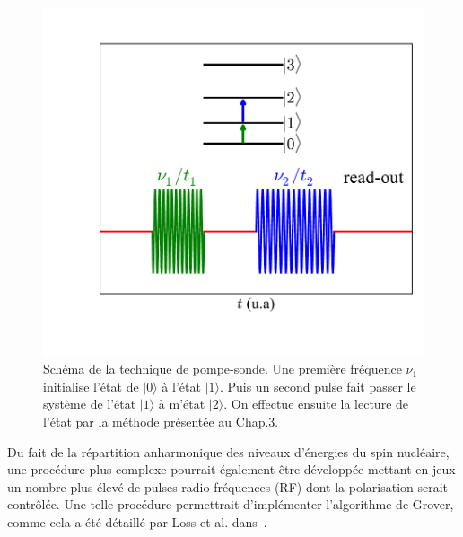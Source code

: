 \begin{figure}[h!]
\parbox{7cm}{
\includegraphics[scale=0.45]{Conclusion/spin_nuc_man/spin_nuc_man.pdf} 
}
\parbox{6.5cm}{\caption{Schéma de la technique de pompe-sonde. Une première fréquence $\nu_1$ initialise l'état de $|0\rangle$ à l'état $|1\rangle$. Puis un second pulse fait passer le système de l'état $|1\rangle$ à m'état $|2\rangle$. On effectue ensuite la lecture de l'état par la méthode présentée au Chap.3.}
\label{spin_nuc_man}
}
\end{figure}

Du fait de la répartition anharmonique des niveaux d’énergies du spin nucléaire, une procédure plus complexe pourrait également être développée mettant en jeux un nombre plus élevé de pulses radio-fréquences (RF) dont la polarisation serait contrôlée. Une telle procédure permettrait d’implémenter l'algorithme de Grover, comme cela a été détaillé par Loss et al. dans~\cite{Leuenberger2003}.



